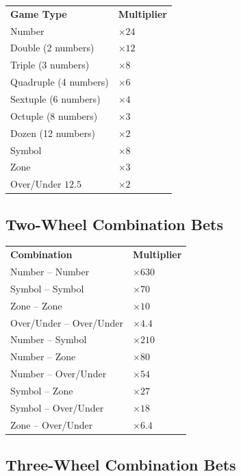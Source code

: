 \begin{center}
\begin{tabular}{ll}
\textbf{Game Type} & \textbf{Multiplier} \\
Number & $\times 24$ \\
Double (2 numbers) & $\times 12$ \\
Triple (3 numbers) & $\times 8$ \\
Quadruple (4 numbers) & $\times 6$ \\
Sextuple (6 numbers) & $\times 4$ \\
Octuple (8 numbers) & $\times 3$ \\
Dozen (12 numbers) & $\times 2$ \\
Symbol & $\times 8$ \\
Zone & $\times 3$ \\
Over/Under $12.5$ & $\times 2$ \\
\end{tabular}
\end{center}

\subsection{Two-Wheel Combination Bets}

\begin{center}
\begin{tabular}{ll}
\textbf{Combination} & \textbf{Multiplier} \\
Number -- Number & $\times 630$ \\
Symbol -- Symbol & $\times 70$ \\
Zone -- Zone & $\times 10$ \\
Over/Under -- Over/Under & $\times 4.4$ \\
Number -- Symbol & $\times 210$ \\
Number -- Zone & $\times 80$ \\
Number -- Over/Under & $\times 54$ \\
Symbol -- Zone & $\times 27$ \\
Symbol -- Over/Under & $\times 18$ \\
Zone -- Over/Under & $\times 6.4$ \\
\end{tabular}
\end{center}

\subsection{Three-Wheel Combination Bets}

